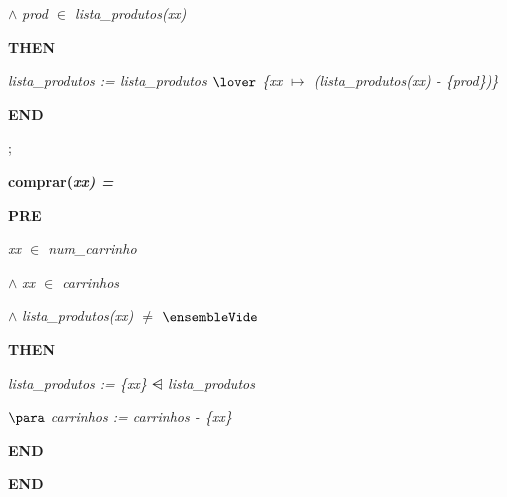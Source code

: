 \documentclass[11pt]{article}
\begin{document}
\begin{sloppypar}
\hspace*{0.40in} $\land$  \it prod $\in$  \it lista\_produtos\rm (\it xx\rm )

\hspace*{0.20in}\bf THEN

\hspace*{0.40in}\it lista\_produtos \rm := \it lista\_produtos  $\lover$  \rm \{\it xx  $\mapsto$  \rm (\it lista\_produtos\rm (\it xx\rm ) \rm - \rm \{\it prod\rm \}\rm )\rm \}

\hspace*{0.20in}\bf END

\hspace*{0.20in}\rm ;

\hspace*{0.20in}\bf comprar\rm (\it xx\rm ) \rm =

\hspace*{0.20in}\bf PRE

\hspace*{0.40in}\it xx $\in$ \it num\_carrinho

\hspace*{0.40in} $\land$  \it xx $\in$  \it carrinhos

\hspace*{0.40in} $\land$  \it lista\_produtos\rm (\it xx\rm )  $\not =$   $\ensembleVide$ 

\hspace*{0.20in}\bf THEN

\hspace*{0.40in}\it lista\_produtos \rm := \rm \{\it xx\rm \}  $\ndres$  \it lista\_produtos

\hspace*{0.40in} $\para$  \it carrinhos \rm := \it carrinhos \rm - \rm \{\it xx\rm \}

\hspace*{0.20in}\bf END

\hspace*{0.20in}

\hspace*{0.20in}

\bf END

\newpage
\end{sloppypar}
\end{document}
